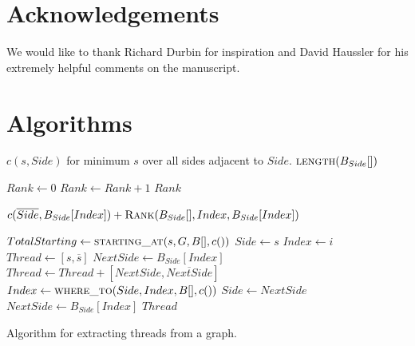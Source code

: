 \section{Acknowledgements}
We would like to thank Richard Durbin for inspiration and David Haussler for his extremely helpful comments on the manuscript.

\section{Algorithms}

\begin{algorithm}[H]
\begin{algorithmic}
	\State {}
    \State {}
    	\State \Return $c(s, Side)$ for minimum $s$ over all sides adjacent to $Side$.
    \Else
    	\State \Return $\Call{length}{B_{Side}[]}$
    \EndIf
\EndFunction

  \State {}
  \State {}
  \State $Rank \gets 0$
      \State $Rank \gets Rank + 1$
    \EndIf
  \EndFor
  \State \Return $Rank$
\EndFunction

\State {}
\State \Return $c(\overline{Side}, B_{Side}[Index]) + \Call{Rank}{B_{Side}[], Index, B_{Side}[Index]}$
\EndFunction

  \State {}
  	\State $TotalStarting \gets \Call{starting\_at}{s, G, B[], c()}$ %
    \ForAll{$i$ in $[0, TotalStarting)$}
    	\State $Side \gets s$
        \State $Index \gets i$
    	\State $Thread \gets [s, \overline{s}]$
        \State $NextSide \gets B_{Side}[Index]$
          \State $Thread \gets Thread + [NextSide, \overline{NextSide}]$
          \State $Index \gets \Call{where\_to}{Side, Index, B[], c()}$
          \State $Side \gets NextSide$
          \State $NextSide \gets B_{Side}[Index]$
        \EndWhile
        \State \Yield $Thread$
    \EndFor
  \EndFor
\EndFunction
\end{algorithmic}
\caption{Algorithm for extracting threads from a graph.}
\label{alg:extractThreads}
\end{algorithm}

